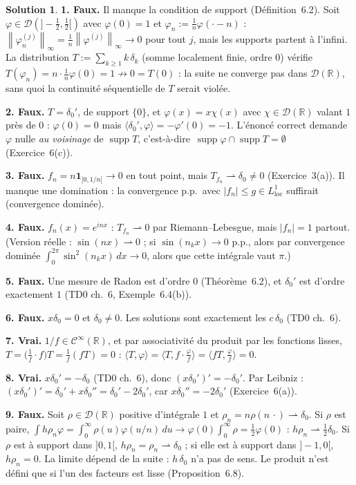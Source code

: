 \documentclass[11pt,a4paper]{article}
\newcommand{\R}{\mathbb{R}}
\newcommand{\norm}[1]{\left\|#1\right\|}
\newcommand{\Cinf}{\mathcal{C}^\infty}
\newcommand{\ie}{c'est-à-dire}
\newcommand{\wk}{\rightharpoonup}
\DeclareMathOperator{\supp}{supp}
\newcommand{\D}{\mathcal{D}}
\theoremstyle{definition}
\newtheorem*{solution}{Solution}
\begin{document}
\begin{solution}
\noindent\textbf{1. Faux.} Il manque la condition de support (Définition~6.2). Soit $\varphi\in\D(]-\frac12,\frac12[)$ avec $\varphi(0)=1$ et $\varphi_n:=\frac1n\varphi(\cdot-n)$ : $\norm{\varphi_n^{(j)}}_\infty=\frac1n\norm{\varphi^{(j)}}_\infty\to0$ pour tout $j$, mais les supports partent à l'infini. La distribution $T:=\sum_{k\ge1}k\,\delta_k$ (somme localement finie, ordre $0$) vérifie $T(\varphi_n)=n\cdot\frac1n\varphi(0)=1\not\to0=T(0)$ : la suite ne converge pas dans $\D(\R)$, sans quoi la continuité séquentielle de $T$ serait violée.

\medskip
\noindent\textbf{2. Faux.} $T=\delta_0'$, de support $\{0\}$, et $\varphi(x)=x\chi(x)$ avec $\chi\in\D(\R)$ valant $1$ près de $0$ : $\varphi(0)=0$ mais $\langle\delta_0',\varphi\rangle=-\varphi'(0)=-1$. L'énoncé correct demande $\varphi$ nulle \emph{au voisinage} de $\supp T$, \ie\ $\supp\varphi\cap\supp T=\emptyset$ (Exercice~6(c)).

\medskip
\noindent\textbf{3. Faux.} $f_n=n\mathbf 1_{]0,1/n[}\to0$ en tout point, mais $T_{f_n}\wk\delta_0\ne0$ (Exercice~3(a)). Il manque une domination : la convergence p.p.\ avec $|f_n|\le g\in L^1_{\mathrm{loc}}$ suffirait (convergence dominée).

\medskip
\noindent\textbf{4. Faux.} $f_n(x)=e^{inx}$ : $T_{f_n}\wk0$ par Riemann--Lebesgue, mais $|f_n|=1$ partout. (Version réelle : $\sin(nx)\wk0$ ; si $\sin(n_kx)\to0$ p.p., alors par convergence dominée $\int_0^{2\pi}\sin^2(n_kx)\,dx\to0$, alors que cette intégrale vaut $\pi$.)

\medskip
\noindent\textbf{5. Faux.} Une mesure de Radon est d'ordre $0$ (Théorème~6.2), et $\delta_0'$ est d'ordre exactement $1$ (TD0 ch.~6, Exemple~6.4(b)).

\medskip
\noindent\textbf{6. Faux.} $x\delta_0=0$ et $\delta_0\ne0$. Les solutions sont exactement les $c\,\delta_0$ (TD0 ch.~6).

\medskip
\noindent\textbf{7. Vrai.} $1/f\in\Cinf(\R)$, et par associativité du produit par les fonctions lisses, $T=\big(\frac1f\cdot f\big)T=\frac1f(fT)=0$ : $\langle T,\varphi\rangle=\langle T,f\cdot\frac\varphi f\rangle=\langle fT,\frac\varphi f\rangle=0$.

\medskip
\noindent\textbf{8. Vrai.} $x\delta_0'=-\delta_0$ (TD0 ch.~6), donc $(x\delta_0')'=-\delta_0'$. Par Leibniz : $(x\delta_0')'=\delta_0'+x\delta_0''=\delta_0'-2\delta_0'$, car $x\delta_0''=-2\delta_0'$ (Exercice~6(a)).

\medskip
\noindent\textbf{9. Faux.} Soit $\rho\in\D(\R)$ positive d'intégrale $1$ et $\rho_n=n\rho(n\,\cdot)\wk\delta_0$. Si $\rho$ est paire, $\int h\rho_n\varphi=\int_0^\infty\rho(u)\varphi(u/n)\,du\to\varphi(0)\int_0^\infty\rho=\frac12\varphi(0)$ : $h\rho_n\wk\frac12\delta_0$. Si $\rho$ est à support dans $]0,1[$, $h\rho_n=\rho_n\wk\delta_0$ ; si elle est à support dans $]-1,0[$, $h\rho_n=0$. La limite dépend de la suite : $h\,\delta_0$ n'a pas de sens. Le produit n'est défini que si l'un des facteurs est lisse (Proposition~6.8).


\end{solution}
\end{document}
